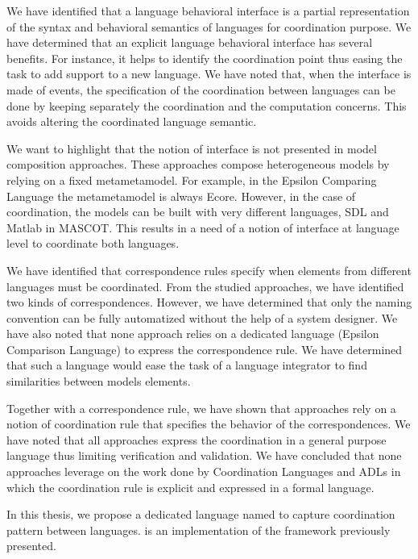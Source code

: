 We have identified that a language behavioral interface is a partial representation of the syntax and behavioral semantics of languages for coordination purpose. We have determined that an explicit language behavioral interface has several benefits. For instance, it helps to identify the coordination point thus easing the task to add support to a new language. We have noted that, when the interface is made of events, the specification of the coordination between languages can be done by keeping separately the coordination and the computation concerns. This avoids altering the coordinated language semantic.

We want to highlight that the notion of interface is not presented in model composition approaches. These approaches compose heterogeneous models by relying on a fixed metametamodel. For example, in the Epsilon Comparing Language the metametamodel is always Ecore. However, in the case of coordination, the models can be built with very different languages, \eg SDL and Matlab in MASCOT. This results in a need of a notion of interface at language level to coordinate both languages.  

We have identified that correspondence rules specify when elements from different languages must be coordinated. From the studied approaches, we have identified two kinds of correspondences. However, we have determined that only the naming convention can be fully automatized without the help of a system designer. We have also noted that none approach relies on a dedicated language (\eg Epsilon Comparison Language) to express the correspondence rule. We have determined that such a language would ease the task of a language integrator to find similarities between models elements.  

Together with a correspondence rule, we have shown that approaches rely on a notion of coordination rule that specifies the behavior of the correspondences. We have noted that all approaches express the coordination in a general purpose language thus limiting verification and validation. We have concluded that none approaches leverage on the work done by Coordination Languages and ADLs in which the coordination rule is explicit and expressed in a formal language.  

In this thesis, we propose a dedicated language named \bcool to capture coordination pattern between languages. \bcool is an implementation of the framework previously presented.  

